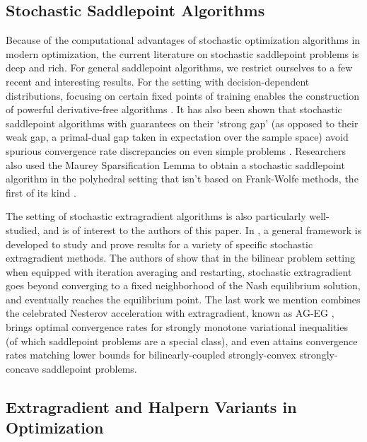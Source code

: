 \documentclass[11pt,reqno,oneside]{amsart}
\theoremstyle{definition}
\numberwithin{equation}{section}
\begin{document}
\subsection{Stochastic Saddlepoint Algorithms}

Because of the computational advantages of stochastic optimization algorithms in modern optimization, the current literature on stochastic saddlepoint problems is deep and rich. 
For general saddlepoint algorithms, we restrict ourselves to a few recent and interesting results.
For the setting with decision-dependent distributions, focusing on certain fixed points of training enables the construction of powerful derivative-free algorithms \cite{wood2023stochastic}. 
It has also been shown that stochastic saddlepoint algorithms with guarantees on their `strong gap' (as opposed to their weak gap, a primal-dual gap taken in expectation over the sample space) avoid spurious convergence rate discrepancies on even simple problems \cite{bassily2023differentially}.
Researchers also used the Maurey Sparsification Lemma to obtain a stochastic saddlepoint algorithm in the polyhedral setting that isn't based on Frank-Wolfe methods, the first of its kind \cite{gonzalez2024mirror}.

The setting of stochastic extragradient algorithms is also particularly well-studied, and is of interest to the authors of this paper. 
In \cite{gorbunov2022stochastic}, a general framework is developed to study and prove results for a variety of specific stochastic extragradient methods.
The authors of \cite{li2022convergence} show that in the bilinear problem setting when equipped with iteration averaging and restarting, stochastic extragradient goes beyond converging to a fixed neighborhood of the Nash equilibrium solution, and eventually reaches the equilibrium point.
The last work we mention combines the celebrated Nesterov acceleration \cite{nesterov1983method_AGM} with extragradient, known as AG-EG \cite{yuan2023optimal}, brings optimal convergence rates for strongly monotone variational inequalities (of which saddlepoint problems are a special class), and even attains convergence rates matching lower bounds for bilinearly-coupled strongly-convex strongly-concave saddlepoint problems.

\subsection{Extragradient and Halpern Variants in Optimization}
\end{document}
